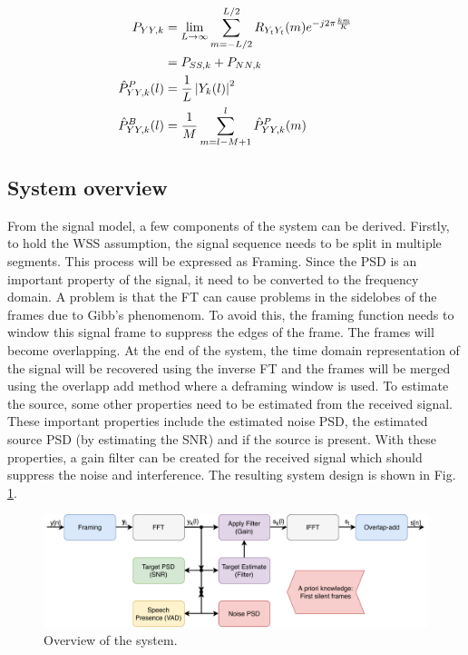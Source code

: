 \begin{align}
  P_{YY,k} &= \lim_{L \to \infty} \sum_{m=-L/2}^{L/2} R_{Y_{t}Y_{t}}(m) e^{-j2\pi \frac{km}{K}}
  \label{eq:pyyk1} \\
  &= P_{SS,k} + P_{NN,k}
  \label{eq:pyyk2} \\
  \hat P_{YY,k}^{P}(l) &= \frac{1}{L}\abs{Y_{k}(l)}^{2}
  \label{eq:pyyest} \\
  \hat P_{YY,k}^{B}(l) &= \frac{1}{M}\sum_{m=l-M+1}^{l} \hat P_{YY,k}^{P}(m)
  \label{eq:pyyBest}
\end{align}

\subsection{System overview}
From the signal model, a few components of the system can be derived. Firstly, to hold the WSS assumption, the signal sequence needs to be split in multiple segments. This process will be expressed as Framing.
Since the PSD is an important property of the signal, it need to be converted to the frequency domain. A problem is that the FT can cause problems in the sidelobes of the frames due to Gibb's phenomenom. To avoid this, the framing function needs to window this signal frame to suppress the edges of the frame. The frames will become overlapping.
At the end of the system, the time domain representation of the signal will be recovered using the inverse FT and the frames will be merged using the overlapp add method where a deframing window is used.
To estimate the source, some other properties need to be estimated from the received signal. These important properties include the estimated noise PSD, the estimated source PSD (by estimating the SNR) and if the source is present. With these properties, a gain filter can be created for the received signal which should suppress the noise and interference.
The resulting system design is shown in Fig. \ref{fig:system}.

\begin{figure}[h]
  \includegraphics[width=\textwidth]{images/system.pdf}
  \caption{Overview of the system.}
  \label{fig:system}
\end{figure}

